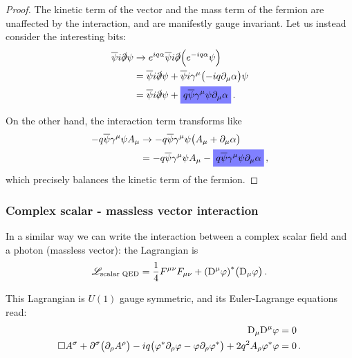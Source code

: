 \documentclass[main.tex]{subfiles}
\begin{document}
\begin{proof}
The kinetic term of the vector and the mass term of the fermion are unaffected by the interaction, and are manifestly gauge invariant. 
Let us instead consider the interesting bits: 
%
\begin{align}
\overline{\psi} i \slashed{\partial} \psi &\to e^{iq \alpha } \overline{\psi} i \slashed{\partial} \qty(e^{-iq \alpha } \psi )  \\
&= \overline{\psi} i \slashed{\partial} \psi 
+ \overline{\psi} i \gamma^{\mu } \qty(-iq \partial_{\mu } \alpha ) \psi  \\
&= \overline{\psi} i \slashed{\partial} \psi
+ \hlc{blue}{q \overline{\psi} \gamma^{\mu } \psi   \partial_{\mu } \alpha }
\,.
\end{align}

On the other hand, the interaction term transforms like 
%
\begin{align}
- q \overline{\psi} \gamma^{\mu } \psi A_{\mu } &\to -q \overline{\psi} \gamma^{\mu } \psi \qty(A_{\mu } + \partial_{\mu } \alpha )  \\
&= -q \overline{\psi} \gamma^{\mu } \psi A_{\mu } - 
\hlc{blue}{q \overline{\psi} \gamma^{\mu } \psi \partial_{\mu } \alpha }
\,,
\end{align}
%
which precisely balances the kinetic term of the fermion. 
\end{proof}

\subsubsection{Complex scalar - massless vector interaction}

In a similar way we can write the interaction between a complex scalar field and a photon (massless vector): the Lagrangian is 
%
\begin{align}
\mathscr{L} _{\text{scalar QED}}
= \frac{1}{4} F^{\mu \nu } F_{\mu \nu } 
+ \qty(\mathrm{D}^{\mu } \varphi )^{*} \qty(\mathrm{D}_{\mu } \varphi )
\,.
\end{align}

\begin{claim}
This Lagrangian is \(U(1)\) gauge symmetric, and 
its Euler-Lagrange equations read: 
%
\begin{align}
\mathrm{D}_{\mu } \mathrm{D}^{\mu } \varphi &= 0   \\
\square A^{\sigma } + \partial^{\sigma } \qty(\partial_{\rho } A^{\rho })
-iq \qty(\varphi^{*} \partial_{\rho } \varphi - \varphi \partial_{\rho } \varphi^{*})
+ 2 q^2 A_{\rho } \varphi^{*} \varphi 
&=0
\,.
\end{align}
\end{claim}
\end{document}
